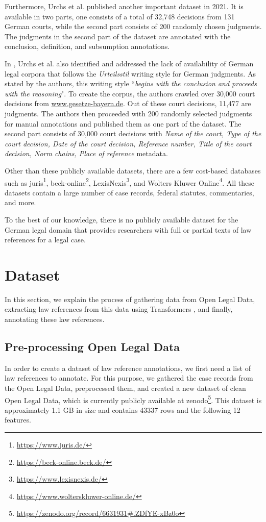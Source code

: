 \documentclass[sigconf]{acmart}
\begin{document}
Furthermore, Urchs et al.\cite{inproceedings} published another important dataset in 2021. It is available in two parts, one consists of a total of 32,748 decisions from 131 German courts, while the second part consists of 200 randomly chosen judgments. The judgments in the second part of the dataset are annotated with the conclusion, definition, and subsumption annotations.

In \cite{urchs2020towards}, Urchs et al. also identified and addressed the lack of availability of German legal corpora that follows the \textit{Urteilsstil} writing style for German judgments. As stated by the authors, this writing style ``\textit{begins with the conclusion and proceeds with the reasoning}". To create the corpus, the authors crawled over 30,000 court decisions from \url{www.gesetze-bayern.de}. Out of these court decisions, 11,477 are judgments. The authors then proceeded with 200 randomly selected judgments for manual annotations and published them as one part of the dataset. The second part consists of 30,000 court decisions with \textit{Name of the court, Type of the court decision, Date of the court decision, Reference number, Title of the court decision, Norm chains, Place of reference} metadata.

Other than these publicly available datasets, there are a few cost-based databases such as juris\footnote{\url{https://www.juris.de/}}, beck-online\footnote{\url{https://beck-online.beck.de/}}, LexisNexis\footnote{\url{https://www.lexisnexis.de/}}, and Wolters Kluwer Online\footnote{\url{https://www.wolterskluwer-online.de/}}. All these datasets contain a large number of case records, federal statutes, commentaries, and more.

To the best of our knowledge, there is no publicly available dataset for the German legal domain that provides researchers with full or partial texts of law references for a legal case.

\section{Dataset}
\label{sec:dataset}

In this section, we explain the process of gathering data from Open Legal Data, extracting law references from this data using Transformers \cite{vaswani2017attention}, and finally, annotating these law references.

\subsection{Pre-processing Open Legal Data}
In order to create a dataset of law reference annotations, we first need a list of law references to annotate. For this purpose, we gathered the case records from the Open Legal Data, preprocessed them, and created a new dataset of clean Open Legal Data, which is currently publicly available at zenodo\footnote{\url{https://zenodo.org/record/6631931\#.ZDfYE-xBz0o}}. This dataset is approximately 1.1 GB in size and contains 43337 rows and the following 12 features.
\end{document}
